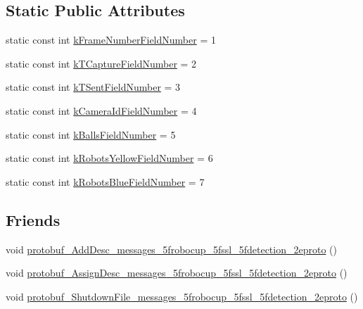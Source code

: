 \subsection*{Static Public Attributes}
\begin{DoxyCompactItemize}
\item 
static const int \hyperlink{class_s_s_l___detection_frame_afaf3c7b2909811ba7663636da62e791f}{k\-Frame\-Number\-Field\-Number} = 1
\item 
static const int \hyperlink{class_s_s_l___detection_frame_a72fa5c42cc34717b29838327bfe49795}{k\-T\-Capture\-Field\-Number} = 2
\item 
static const int \hyperlink{class_s_s_l___detection_frame_a8e2af6a5595c5a79a5e2d9114093d4b0}{k\-T\-Sent\-Field\-Number} = 3
\item 
static const int \hyperlink{class_s_s_l___detection_frame_a7f8f757a54c37b02fa99932c17dac493}{k\-Camera\-Id\-Field\-Number} = 4
\item 
static const int \hyperlink{class_s_s_l___detection_frame_adf7e56756c962d10fb3627221ab051c2}{k\-Balls\-Field\-Number} = 5
\item 
static const int \hyperlink{class_s_s_l___detection_frame_a6be94adb9b8832da827553336afa3669}{k\-Robots\-Yellow\-Field\-Number} = 6
\item 
static const int \hyperlink{class_s_s_l___detection_frame_a983af72189e439b2469965e4957d492c}{k\-Robots\-Blue\-Field\-Number} = 7
\end{DoxyCompactItemize}
\subsection*{Friends}
\begin{DoxyCompactItemize}
\item 
void \hyperlink{class_s_s_l___detection_frame_a238ecf23556fbaa6d77409838dbb8e59}{protobuf\-\_\-\-Add\-Desc\-\_\-messages\-\_\-5frobocup\-\_\-5fssl\-\_\-5fdetection\-\_\-2eproto} ()
\item 
void \hyperlink{class_s_s_l___detection_frame_a8c97dea58197fa3da2e50d8a912299bd}{protobuf\-\_\-\-Assign\-Desc\-\_\-messages\-\_\-5frobocup\-\_\-5fssl\-\_\-5fdetection\-\_\-2eproto} ()
\item 
void \hyperlink{class_s_s_l___detection_frame_a2e69f2df742d8d46e426bbf86248ca01}{protobuf\-\_\-\-Shutdown\-File\-\_\-messages\-\_\-5frobocup\-\_\-5fssl\-\_\-5fdetection\-\_\-2eproto} ()
\end{DoxyCompactItemize}


